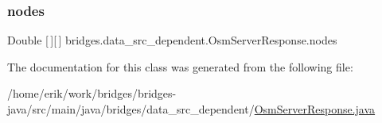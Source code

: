 \subsubsection{\texorpdfstring{nodes}{nodes}}
{\footnotesize\ttfamily Double \mbox{[}$\,$\mbox{]}\mbox{[}$\,$\mbox{]} bridges.\+data\+\_\+src\+\_\+dependent.\+Osm\+Server\+Response.\+nodes}



The documentation for this class was generated from the following file\+:\begin{DoxyCompactItemize}
\item 
/home/erik/work/bridges/bridges-\/java/src/main/java/bridges/data\+\_\+src\+\_\+dependent/\hyperlink{_osm_server_response_8java}{Osm\+Server\+Response.\+java}\end{DoxyCompactItemize}

